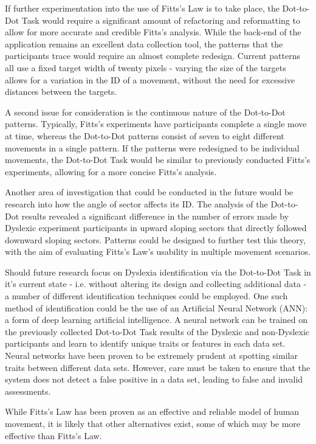 		If further experimentation into the use of Fitts’s Law is to take place, the Dot-to-Dot Task would require a significant amount of refactoring and reformatting to allow for more accurate and credible Fitts’s analysis. While the back-end of the application remains an excellent data collection tool, the patterns that the participants trace would require an almost complete redesign. Current patterns all use a fixed target width of twenty pixels - varying the size of the targets allows for a variation in the ID of a movement, without the need for excessive distances between the targets. 
		
		A second issue for consideration is the continuous nature of the Dot-to-Dot patterns. Typically, Fitts’s experiments have participants complete a single move at time, whereas the Dot-to-Dot patterns consist of seven to eight different movements in a single pattern. If the patterns were redesigned to be individual movements, the Dot-to-Dot Task would be similar to previously conducted Fitts’s experiments, allowing for a more concise Fitts’s analysis.
		
		Another area of investigation that could be conducted in the future would be research into how the angle of sector affects its ID. The analysis of the Dot-to-Dot results revealed a significant difference in the number of  errors made by Dyslexic experiment participants in upward sloping sectors that directly followed downward sloping sectors. Patterns could be designed to further test this theory, with the aim of evaluating Fitts’s Law’s usability in multiple movement scenarios.
		
		Should future research focus on Dyslexia identification via the Dot-to-Dot Task in it’s current state - i.e. without altering its design and collecting additional data - a number of different identification techniques could be employed. One such method of identification could be the use of an Artificial Neural Network (ANN): a form of  deep learning artificial intelligence. A neural network can be trained on the previously collected Dot-to-Dot Task results of the Dyslexic and non-Dyslexic participants and learn to identify unique traits or features in each data set. Neural networks have been proven to be extremely prudent at spotting similar traits between different data sets. However, care must be taken to ensure that the system does not detect a false positive in a data set, leading to false and invalid assessments.
		
		While Fitts’s Law has been proven as an effective and reliable model of human movement, it is likely that other alternatives exist, some of which may be more effective than Fitts’s Law.
		
